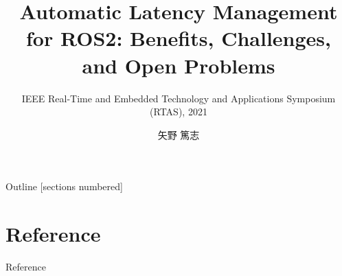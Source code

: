 \newcommand{\beamerDir}[0]{/mnt/c/Users/atsushi/Documents/workspace/env/Beamer/beamer/beamer/}





\newcommand{\forme}[1]{}


\title{Automatic Latency Management for ROS2: Benefits, Challenges, and Open Problems}
\subtitle{IEEE Real-Time and Embedded Technology and Applications Symposium (RTAS), 2021}
\author{矢野 篤志}




\maketitle



\begin{frame}{Outline}
    [sections numbered]
    \scriptsize\tableofcontents[hideallsubsections]
\end{frame}

% 
% 
% 
% 
% 
% 
% 
% 


\lastpage

\section*{Reference}
\begin{frame}[allowframebreaks]{Reference}
    \beamertemplatetextbibitems
    
    
\end{frame}


